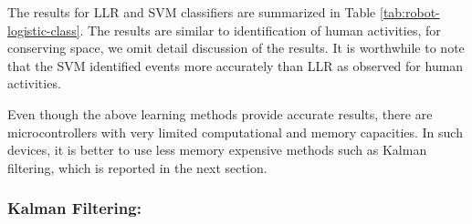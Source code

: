 \documentclass[letterpaper]{article}
\begin{document}
\begin{sloppy}
The results for LLR and SVM classifiers are summarized in Table \ref{tab:robot-logistic-class}. The results are similar to identification of human activities, for 
conserving space, we omit detail discussion of the results. It is worthwhile to note that the SVM 
 identified events more accurately than LLR as observed for human activities.  





Even though the above learning methods provide accurate results, there are microcontrollers with 
very limited computational and memory capacities. In such devices, it is better to use less memory 
expensive methods such as Kalman filtering, which is reported in the next section.

\subsubsection{Kalman Filtering:}


\end{sloppy}
\end{document}
